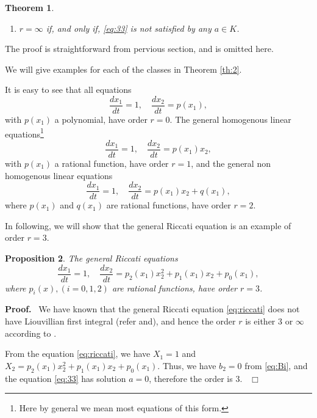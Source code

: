 \documentclass[preprint,12pt]{elsarticle}
\newtheorem{thm}{Theorem}
\newtheorem{prop}[thm]{Proposition}
\newenvironment{proof}[1][Proof]{\textbf{#1.}\ }{\ $\Box$}
\begin{document}
\begin{thm}
\begin{enumerate}
\begin{equation}
\eta = \dfrac{1}{X_1} \exp\left[\int_{(x_1^0,x_2^0)}^{(x_1,x_2)}(-\delta_2 \dfrac{X_2}{X_1} - \dfrac{X_2}{X_1} u) d x_1 + u d x_2\right],
\end{equation}
where $u$ is a solution of following partial differential equations
\begin{equation}
\left\{
\begin{array}{rcl}
\delta_1 u &=& - \delta_2^2 \dfrac{X_2}{X_1} - \dfrac{X_2}{X_1}a - (\delta_2 \dfrac{X_2}{X_1}) u - \dfrac{1}{2}(\dfrac{X_2}{X_1})u^2\\
\delta_2 u &=& a + \dfrac{1}{2} u^2.
\end{array}
\right.
\end{equation}
 \item[(5)] $r=\infty$ if, and only if, \eqref{eq:33} is not satisfied by any $a\in K$.
\end{enumerate}
\end{thm}

The proof is straightforward from pervious section, and is omitted here. 

We will give examples for each of the classes in Theorem \ref{th:2}.

It is easy to see that all equations
\begin{equation}
\frac{d x_1}{d t} = 1,\quad \dfrac{d x_2}{d t} = p(x_1),
\end{equation} 
with $p(x_1)$ a polynomial, have order $r=0$. The general homogenous linear equations\footnote{Here by general we mean most equations of this form.}
\begin{equation}
\frac{d x_1}{d t} = 1,\quad \dfrac{d x_2}{d t} = p(x_1) x_2,
\end{equation}
with $p(x_1)$ a rational function, have order $r = 1$, and the general non homogenous linear equations
\begin{equation}
\frac{d x_1}{d t} = 1,\quad \dfrac{d x_2}{d t} = p(x_1) x_2 + q(x_1),
\end{equation}
where $p(x_1)$ and $q(x_1)$ are rational functions, have order $r = 2$. 

In following, we will show that the general Riccati equation is an example of order $r = 3$.
\begin{prop}
\label{cor:3} The general Riccati
equations
\begin{equation}
\label{eq:riccati}
\dfrac{d x_1}{d t} = 1,\quad \frac{d x_2}{d t} = p_2(x_1) x_2^2 + p_1(x_1) x_2 + p_0(x_1),
\end{equation}
where $p_i(x), (i=0,1,2)$ are rational functions, have order $r = 3$.
\end{prop}
\begin{proof} We have known that the general Riccati equation \eqref{eq:riccati} does not have Liouvillian first integral (refer \cite{L:41} and\cite{Singer:92}), and hence the order $r $ is either $3$ or $\infty$ according to \cite{Singer:92}. 

From the equation \eqref{eq:riccati}, we have $X_1 = 1$ and $X_2 = p_2(x_1) x_2^2 + p_1(x_1) x_2 + p_0(x_1).$
Thus, we have $b_2 = 0$ from \eqref{eq:Bi}, and the equation \eqref{eq:33} has solution $a = 0$, therefore the order is $3$.
\end{proof}
\end{document}
